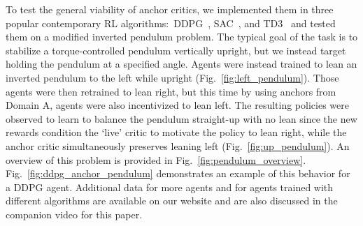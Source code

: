 \documentclass[letterpaper, 10 pt, conference]{ieeeconf} %
\newcommand{\note}[1]{\textcolor{red}{#1}}
\newcommand{\rev}[1]{\textcolor{black}{#1}}
\begin{document}
        To test the general viability of anchor critics, we implemented them in three popular contemporary RL algorithms:~DDPG~\cite{DDPG}, SAC~\cite{SAC}, and TD3~\cite{TD3} and tested them on a modified inverted pendulum problem.
        The typical goal of the task is to stabilize a torque-controlled pendulum vertically upright, but we instead target holding the pendulum at a specified angle.
        Agents were instead trained to lean an inverted pendulum to the left while upright (Fig.~\ref{fig:left_pendulum}).
        Those agents were then retrained to lean right, but this time by using anchors from Domain A, agents were also incentivized to lean left.
        The resulting policies were observed to learn to balance the pendulum straight-up with no lean since the new rewards condition the `live' critic to motivate the policy to lean right, while the anchor critic simultaneously preserves leaning left (Fig.~\ref{fig:up_pendulum}).
        An overview of this problem is provided in Fig.~\ref{fig:pendulum_overview}.
        Fig.~\ref{fig:ddpg_anchor_pendulum} demonstrates an example of this behavior for a DDPG agent.
        Additional data for more agents and for agents trained with different algorithms are available on our website \cite{supplementary} and are also discussed in the companion video for this paper.
        
\end{document}
